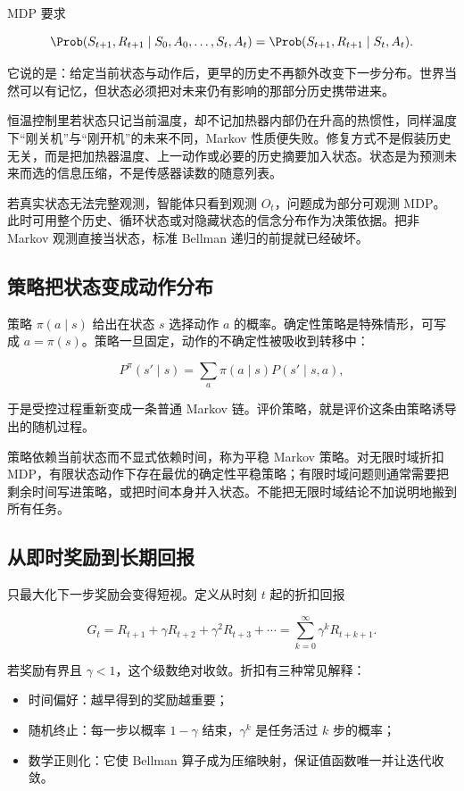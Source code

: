 MDP 要求

\[
\Prob(S_{t+1},R_{t+1}\mid S_0,A_0,\ldots,S_t,A_t)
=
\Prob(S_{t+1},R_{t+1}\mid S_t,A_t).
\]

它说的是：给定当前状态与动作后，更早的历史不再额外改变下一步分布。世界当然可以有记忆，但状态必须把对未来仍有影响的那部分历史携带进来。

恒温控制里若状态只记当前温度，却不记加热器内部仍在升高的热惯性，同样温度下``刚关机''与``刚开机''的未来不同，Markov 性质便失败。修复方式不是假装历史无关，而是把加热器温度、上一动作或必要的历史摘要加入状态。状态是为预测未来而选的信息压缩，不是传感器读数的随意列表。

若真实状态无法完整观测，智能体只看到观测 \(O_t\)，问题成为部分可观测 MDP。此时可用整个历史、循环状态或对隐藏状态的信念分布作为决策依据。把非 Markov 观测直接当状态，标准 Bellman 递归的前提就已经破坏。

\subsection{策略把状态变成动作分布}

策略 \(\pi(a\mid s)\) 给出在状态 \(s\) 选择动作 \(a\) 的概率。确定性策略是特殊情形，可写成 \(a=\pi(s)\)。策略一旦固定，动作的不确定性被吸收到转移中：

\[
P^\pi(s'\mid s)
=
\sum_a \pi(a\mid s)P(s'\mid s,a),
\]

于是受控过程重新变成一条普通 Markov 链。评价策略，就是评价这条由策略诱导出的随机过程。

策略依赖当前状态而不显式依赖时间，称为平稳 Markov 策略。对无限时域折扣 MDP，有限状态动作下存在最优的确定性平稳策略；有限时域问题则通常需要把剩余时间写进策略，或把时间本身并入状态。不能把无限时域结论不加说明地搬到所有任务。

\subsection{从即时奖励到长期回报}

只最大化下一步奖励会变得短视。定义从时刻 \(t\) 起的折扣回报

\[
G_t
=R_{t+1}+\gamma R_{t+2}+\gamma^2R_{t+3}+\cdots
=\sum_{k=0}^{\infty}\gamma^kR_{t+k+1}.
\]

若奖励有界且 \(\gamma<1\)，这个级数绝对收敛。折扣有三种常见解释：

\begin{itemize}
\tightlist
\item
  时间偏好：越早得到的奖励越重要；
\item
  随机终止：每一步以概率 \(1-\gamma\) 结束，\(\gamma^k\) 是任务活过 \(k\) 步的概率；
\item
  数学正则化：它使 Bellman 算子成为压缩映射，保证值函数唯一并让迭代收敛。
\end{itemize}

